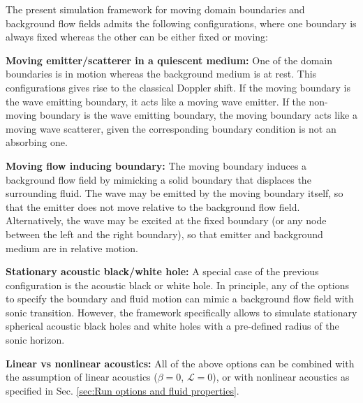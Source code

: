 The present simulation framework for moving domain boundaries and background flow fields admits the following configurations, where one boundary is always fixed whereas the other can be either fixed or moving:
\begin{compactitem}
\item \textbf{Moving emitter/scatterer in a quiescent medium:} One of the domain boundaries is in motion whereas the background medium is at rest. This configurations gives rise to the classical Doppler shift. If the moving boundary is the wave emitting boundary, it acts like a moving wave emitter. If the non-moving boundary is the wave emitting boundary, the moving boundary acts like a moving wave scatterer, given the corresponding boundary condition is not an absorbing one.
\item \textbf{Moving flow inducing boundary:} The moving boundary induces a background flow field by mimicking a solid boundary that displaces the surrounding fluid. The wave may be emitted by the moving boundary itself, so that the emitter does not move relative to the background flow field. Alternatively, the wave may be excited at the fixed boundary (or any node between the left and the right boundary), so that emitter and background medium are in relative motion.
\item \textbf{Stationary acoustic black/white hole:} A special case of the previous configuration is the acoustic black or white hole. In principle, any of the options to specify the boundary and fluid motion can mimic a background flow field with sonic transition. However, the framework specifically allows to simulate stationary spherical acoustic black holes and white holes with a pre-defined radius of the sonic horizon.
\item \textbf{Linear vs nonlinear acoustics:} All of the above options can be combined with the assumption of linear acoustics ($\beta=0$, $\mathcal{L}=0$), or with nonlinear acoustics as specified in Sec. \ref{sec:Run options and fluid properties}.
\end{compactitem}

